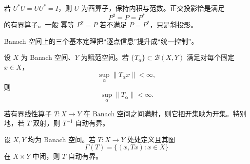 \begin{definition}[酉算子与正交投影]
若 $U^*U=UU^*=I$，则 $U$ 为酉算子，保持内积与范数。正交投影恰是满足
\[
P^2=P=P^*
\]
的有界算子。一般 幂等 $P^2=P$ 若不满足 $P=P^*$，只是斜投影。
\end{definition}

Banach 空间上的三个基本定理把“逐点信息”提升成“统一控制”。

\begin{theorem}[一致有界原理]
设 $X$ 为 Banach 空间、$Y$ 为赋范空间。若 $\{T_\alpha\}\subset\mathcal B(X,Y)$ 满足对每个固定 $x\in X$，
\[
\sup_\alpha\|T_\alpha x\|<\infty,
\]
则
\[
\boxed{\sup_\alpha\|T_\alpha\|<\infty}.
\]
\end{theorem}

\begin{theorem}[开映射定理]
若有界线性算子 $T:X\to Y$ 在 Banach 空间之间满射，则它把开集映为开集。特别地，若 $T$ 双射，则 $T^{-1}$ 自动有界。
\end{theorem}

\begin{theorem}[闭图定理]
设 $X,Y$ 均为 Banach 空间。若 $T:X\to Y$ 处处定义且其图
\[
\Gamma(T)=\{(x,Tx):x\in X\}
\]
在 $X\times Y$ 中闭，则 $T$ 自动有界。
\end{theorem}

